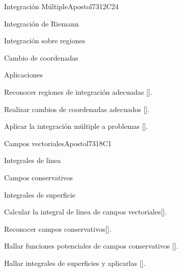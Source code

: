 \begin{syllabus}
\begin{unit}{}{Integración Múltiple}{Apostol73}{12}{C24}
   \begin{topics}
      \item Integración de Riemann
      \item Integración sobre regiones
      \item Cambio de coordenadas
      \item Aplicaciones
      \end{topics}
   \begin{learningoutcomes}
      \item Reconocer regiones de integración adecuadas [\Usage].
      \item Realizar cambios de coordenadas adecuados [\Usage].
      \item Aplicar la integración múltiple a problemas [\Usage].
      \end{learningoutcomes}
\end{unit}

\begin{unit}{}{Campos vectoriales}{Apostol73}{18}{C1}
   \begin{topics}
      \item Integrales de linea
      \item Campos conservativos
      \item Integrales de superficie
   \end{topics}
   \begin{learningoutcomes}
      \item Calcular la integral de linea de campos vectoriales[\Usage].
      \item Reconocer campos conservativos[\Usage].
      \item Hallar funciones potenciales de campos conservativos [\Usage].
      \item Hallar integrales de superficies y aplicarlas [\Usage].
      \end{learningoutcomes}
\end{unit}



\begin{coursebibliography}
\end{coursebibliography}

\end{syllabus}

%
